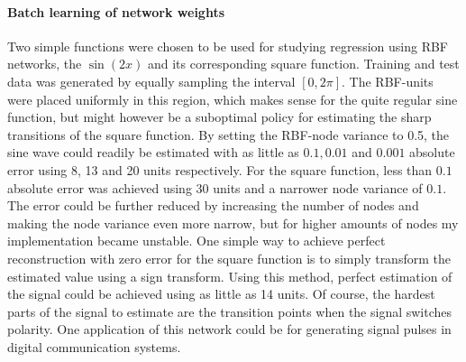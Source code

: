 \documentclass[a4paper]{article}
\begin{document}
\paragraph{Batch learning of network weights}
Two simple functions were chosen to be used for studying regression using RBF networks, the $\sin(2x)$ and its corresponding square function. Training and test data was generated by equally sampling the interval $[0, 2\pi]$. The RBF-units were placed uniformly in this region, which makes sense for the quite regular sine function, but might however be a suboptimal policy for estimating the sharp transitions of the square function. 
By setting the RBF-node variance to 0.5, the sine wave could readily be estimated with as little as $0.1, 0.01$ and $0.001$ absolute error using 8, 13 and 20 units respectively. For the square function, less than $0.1$ absolute error was achieved using 30 units and a narrower node variance of $0.1$. The error could be further reduced by increasing the number of nodes and making the node variance even more narrow, but for higher amounts of nodes my implementation became unstable. One simple way to achieve perfect reconstruction with zero error for the square function is to simply transform the estimated value using a sign transform. Using this method, perfect estimation of the signal could be achieved using as little as 14 units. Of course, the hardest parts of the signal to estimate are the transition points when the signal switches polarity. One application of this network could be for generating signal pulses in digital communication systems.
\\
\end{document}
